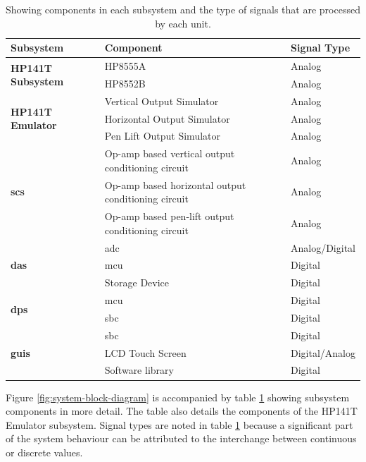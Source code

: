 \documentclass[class=report,11pt,crop=false]{standalone}
\begin{document}
	\begin{table}[ht!]
		\centering
		\label{tab:subsystem-components}
		\begin{tabular}{|m{18em}|m{15em}|m{8em}|}
			\hline
			\cellcolor{cyan!25}\textbf{Subsystem}	& \cellcolor{cyan!25}\textbf{Component}	& \cellcolor{cyan!25}\textbf{Signal Type}\\
			\hline
			\multirow{2}{*}{\textbf{HP141T Subsystem}}	& HP8555A	& Analog\\
			\cline{2-3}
														& HP8552B	& Analog\\
			\hline
			\multirow{3}{*}{\textbf{HP141T Emulator}}	& Vertical Output Simulator	& Analog\\
			\cline{2-3}
														& Horizontal Output Simulator & Analog\\
			\cline{2-3}
														& Pen Lift Output Simulator	& Analog\\
			\hline
			\multirow{3}{*}{\textbf{\acrlong{scs}}}	& Op-amp based vertical output conditioning circuit													& Analog\\
			\cline{2-3}
														& Op-amp based horizontal output conditioning circuit		& Analog\\
			\cline{2-3}
														& Op-amp based pen-lift output conditioning circuit 	& Analog\\
			\hline
			\multirow{3}{*}{\textbf{\acrlong{das}}}	& \acrshort{adc} & Analog/Digital\\
			\cline{2-3}
														& \acrshort{mcu} & Digital\\
			\cline{2-3}
														& Storage Device & Digital\\
			\hline
			\multirow{2}{*}{\textbf{\acrlong{dps}}}	& \acrshort{mcu} & Digital\\
			\cline{2-3}
														& \acrshort{sbc} & Digital\\
			\hline
			\multirow{3}{*}{\textbf{\acrlong{guis}}}	& \acrshort{sbc} & Digital\\
			\cline{2-3}
														& LCD Touch Screen & Digital/Analog\\
			\cline{2-3}
														& Software library & Digital \\
			\hline
		\end{tabular}
		\caption{Showing components in each subsystem and the type of signals that are processed by each unit.}
	\end{table}

	Figure \ref{fig:system-block-diagram} is accompanied by table \ref{tab:subsystem-components} showing subsystem components in more detail. The table also details the components of the HP141T Emulator subsystem. Signal types are noted in table \ref{tab:subsystem-components} because a significant part of the system behaviour can be attributed to the interchange between continuous or discrete values. 
	
\end{document}
